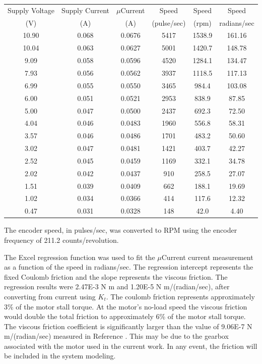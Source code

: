 \documentclass[12pt,letterpaper]{article}
\begin{document}
\begin{appendices}
\begin{tabular}{|c|c|c|c|c|c|}
Supply Voltage & Supply Current & $\mu$Current & Speed & Speed & Speed\\
(V) & (A) & (A) & (pulse/sec) & (rpm) & radians/sec\\
\hline
10.90 & 0.068 & 0.0676 & 5417 & 1538.9 & 161.16\\
10.04 & 0.063 & 0.0627 & 5001 & 1420.7 & 148.78\\
9.09 & 0.058 & 0.0596 & 4520 & 1284.1 & 134.47\\
7.93 & 0.056 & 0.0562 & 3937 & 1118.5 & 117.13\\
6.99 & 0.055 & 0.0550 & 3465 & 984.4 & 103.08\\
6.00 & 0.051 & 0.0521 & 2953 & 838.9 & 87.85\\
5.00 & 0.047 & 0.0500 & 2437 & 692.3 & 72.50\\
4.04 & 0.046 & 0.0483 & 1960 & 556.8 & 58.31\\
3.57 & 0.046 & 0.0486 & 1701 & 483.2 & 50.60\\
3.02 & 0.047 & 0.0481 & 1421 & 403.7 & 42.27\\
2.52 & 0.045 & 0.0459 & 1169 & 332.1 & 34.78\\
2.02 & 0.042 & 0.0437 & 910 & 258.5 & 27.07\\
1.51 & 0.039 & 0.0409 & 662 & 188.1 & 19.69\\
1.02 & 0.034 & 0.0366 & 414 & 117.6 & 12.32\\
0.47 & 0.031 & 0.0328 & 148 & 42.0 & 4.40\\
\end{tabular}

The encoder speed, in pulses/sec, was converted to RPM using the encoder frequency of 211.2
counts/revolution.

The Excel regression function was used to fit the $\mu$Current current measurement as a function
of the speed in radians/sec.  The regression intercept represents the fixed Coulomb friction and the
slope represents the viscous friction.  The regression results were 2.47E-3 N m and 1.20E-5 N m/(radian/sec),
after converting from current using $K_{t}$.  The coulomb friction represents approximately 3\% of the 
motor stall torque.  At the motor's no-load speed the viscous friction would double the total friction to 
approximately 6\% of the motor stall torque.  The viscous friction coefficient is significantly larger than
the value of 9.06E-7 N m/(radian/sec) measured in Reference \cite{twoWheeled}.  This may be due to
the gearbox associated with the motor used in the current work.  In any event, the friction will be included
in the system modeling.



\end{appendices}
\end{document}
